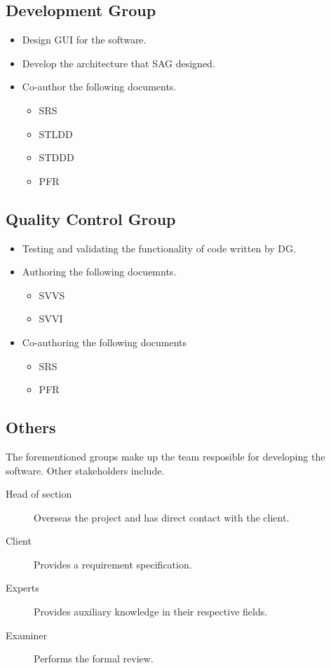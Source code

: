 \documentclass{article}
\begin{document}
    \subsection{Development Group}
        \begin{itemize}
            \item Design GUI for the software.
            \item Develop the architecture that SAG designed.
            \item Co-author the following documents.
                \begin{itemize}
                    \item SRS
                    \item STLDD
                    \item STDDD
                    \item PFR
                \end{itemize}
        \end{itemize}
    
    \subsection{Quality Control Group}
        \begin{itemize}
            \item Testing and validating the functionality of code written by DG.
            \item Authoring the following docuemnts.
            \begin{itemize}
                \item SVVS
                \item SVVI
            \end{itemize}
            \item Co-authoring the following documents
                \begin{itemize}
                    \item SRS
                    \item PFR
                \end{itemize}
        \end{itemize}
        
    \subsection{Others}
        The forementioned groups make up the team resposible for developing the software. Other stakeholders include. 
        \begin{description}
            \item [Head of section] Overseas the project and has direct contact with the client. 
            \item [Client] Provides a requirement specification.
            \item [Experts] Provides auxiliary knowledge in their respective fields. 
            \item [Examiner] Performs the formal review.
        \end{description}
\newpage
\end{document}
